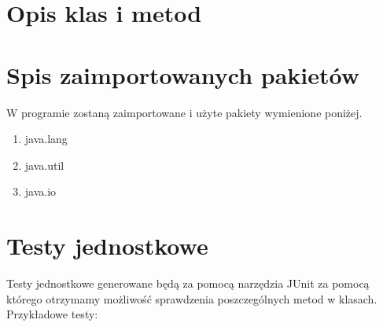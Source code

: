 \documentclass[12pt]{article}
\begin{document}
\section{Opis klas i metod}

\section{Spis zaimportowanych pakietów}
W programie zostaną zaimportowane i użyte pakiety wymienione poniżej. 
\begin{enumerate}
    \item java.lang
    \item java.util
    \item java.io
    
\end{enumerate}

\section{Testy jednostkowe}
Testy jednostkowe generowane będą za pomocą narzędzia JUnit za pomocą którego otrzymamy możliwość sprawdzenia poszczególnych metod w klasach.
Przykładowe testy:
\end{document}
